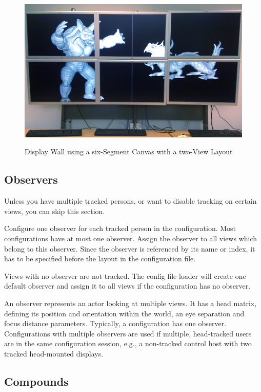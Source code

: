 \documentclass[10pt,a4]{scrartcl}
\begin{document}
\begin{figure}[ht!]\center
  \includegraphics[width=.9\textwidth]{images/wallLayout.jpg}
  {\label{fDisplay}\caption{Display Wall using a six-Segment Canvas with a two-View Layout}}
\end{figure}

\subsection{Observers}

Unless you have multiple tracked persons, or want to disable tracking on
certain views, you can skip this section.

Configure one \textsf{observer} for each tracked person in the
configuration. Most configurations have at most one observer. Assign the
observer to all views which belong to this observer. Since the observer
is referenced by its name or index, it has to be specified before the
layout in the configuration file.

Views with no observer are not tracked. The config file loader will
create one default observer and assign it to all views if the
configuration has no observer.

An observer represents an actor looking at multiple views. It has a head matrix,
defining its position and orientation within the world, an eye separation and
focus distance parameters. Typically, a configuration has one
observer. Configurations with multiple observers are used if multiple,
head-tracked users are in the same configuration session, e.g., a non-tracked
control host with two tracked head-mounted displays.

\subsection{\label{sCompounds}Compounds}
\end{document}
